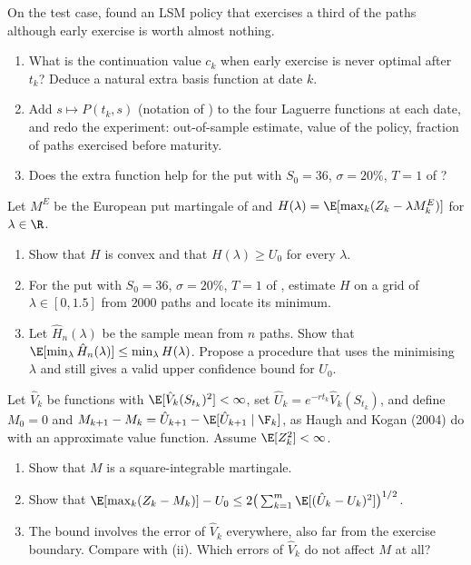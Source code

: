 \begin{exercise}\label{ex:am-european-basis}
\medium On the test case,  found an LSM policy that exercises a third
of the paths although early exercise is worth almost nothing.
\begin{enumerate}[label=(\alph*)]
  \item What is the continuation value $c_k$ when early exercise is never optimal after
    $t_k$? Deduce a natural extra basis function at date $k$.
  \item Add $s\mapsto P(t_k,s)$ (notation of ) to the four
    Laguerre functions at each date, and redo the experiment: out-of-sample estimate, value of
    the policy, fraction of paths exercised before maturity.
  \item Does the extra function help for the put with $S_0=36$, $\sigma=20\%$, $T=1$ of
    ?
\end{enumerate}
\end{exercise}

\begin{exercise}\label{ex:am-rogers}
\medium Let $M^E$ be the European put martingale of  and
$H(\lambda)=\E[\max_k(Z_k-\lambda M^E_k)]$ for $\lambda\in\R$.
\begin{enumerate}[label=(\alph*)]
  \item Show that $H$ is convex and that $H(\lambda)\ge U_0$ for every $\lambda$.
  \item For the put with $S_0=36$, $\sigma=20\%$, $T=1$ of , estimate $H$ on a
    grid of $\lambda\in[0,1.5]$ from $2000$ paths and locate its minimum.
  \item Let $\hat H_n(\lambda)$ be the sample mean from $n$ paths. Show that
    $\E[\min_\lambda\hat H_n(\lambda)]\le\min_\lambda H(\lambda)$. Propose a procedure that
    uses the minimising $\lambda$ and still gives a valid upper confidence bound for $U_0$.
\end{enumerate}
\end{exercise}

\begin{exercise}\label{ex:am-hk-gap}
\medium Let $\hat V_k$ be functions with $\E[\hat V_k(S_{t_k})^2]<\infty$, set
$\hat U_k=e^{-rt_k}\hat V_k(S_{t_k})$, and define $M_0=0$ and
$M_{k+1}-M_k=\hat U_{k+1}-\E[\hat U_{k+1}\mid\F_k]$, as Haugh and Kogan (2004) do with an
approximate value function. Assume $\E[Z_k^2]<\infty$.
\begin{enumerate}[label=(\alph*)]
  \item Show that $M$ is a square-integrable martingale.
  \item Show that
    $\E[\max_k(Z_k-M_k)]-U_0\le2\big(\sum_{k=1}^m\E[(\hat U_k-U_k)^2]\big)^{1/2}$.
  \item The bound involves the error of $\hat V_k$ everywhere, also far from the exercise
    boundary. Compare with (ii). Which errors of $\hat V_k$
    do not affect $M$ at all?
\end{enumerate}
\end{exercise}

